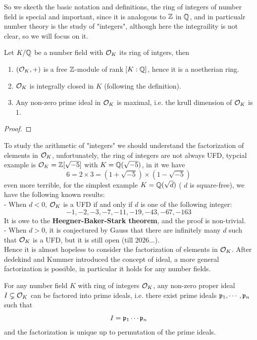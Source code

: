 So we skecth the basic notation and definitions, the ring of integers of number field is special and important, since it is analogous to \(\mathbb{Z}\) in \(\mathbb{Q}\), and in particualr number theory is the study of "integers", although here the integraility is not clear, so we will focus on it.

\begin{colortheorem}
    Let \(K/ \mathbb{Q}\) be a number field with \(\mathcal{O}_K\) its ring of intgers, then
    \begin{enumerate}
        \item \((\mathcal{O}_K,+)\) is a free \(\mathbb{Z}\)-module of rank \([K:\mathbb{Q}]\), hence it is a noetherian ring.
        \item \(\mathcal{O}_K\) is integrally closed in \(K\) (following the definition).
        \item Any non-zero prime ideal in \(\mathcal{O}_K\) is maximal, i.e. the krull dimension of \(\mathcal{O}_K\) is 1.
    \end{enumerate}
\end{colortheorem}
\begin{proof}

\end{proof}

To study the arithmetic of "integers" we should understand the factorization of elements in \(\mathcal{O}_K\), unfortunately, the ring of integers are not always UFD, typcial example is \(\mathcal{O}_K = \mathbb{Z}[\sqrt{-5}]\) with \(K = \mathbb{Q}(\sqrt{-5})\), in it we have
\[6 = 2 \times 3 = (1 + \sqrt{-5})\times (1 - \sqrt{-5})\]
even more terrible, for the simplest example \(K=\mathbb{Q}(\sqrt{d})\) ( \(d\) is square-free), we have the following known results:\\

- When \(d<0\), \(\mathcal{O}_K\) is a UFD if and only if \(d\) is one of the following integer:
\[-1,-2,-3,-7,-11,-19,-43,-67,-163\]
It is owe to the \textbf{Heegner-Baker-Stark theorem}, and the proof is non-trivial.\\

- When \(d>0\), it is conjectured by Gauss that there are infinitely many \(d\) such that \(\mathcal{O}_K\) is a UFD, but it is still open (till 2026...).\\

Hence it is almost hopeless to consider the factorization of elements in \(\mathcal{O}_K\). After dedekind and Kummer introduced the concept of ideal, a more general factorization is possible, in particular it holds for any number fields.

\begin{colortheorem} \label{fract}
    For any number field \(K\) with ring of integers \(\mathcal{O}_K\), any non-zero proper ideal \(I \subsetneq \mathcal{O}_K\) can be factored into prime ideals, i.e. there exist prime ideals \(\mathfrak{p}_1,\cdots,\mathfrak{p}_n\) such that
    \[I = \mathfrak{p}_1 \cdots \mathfrak{p}_n\]
and the factorization is unique up to permutation of the prime ideals.
\end{colortheorem}

